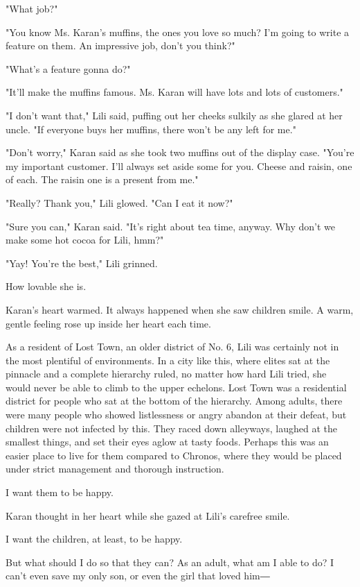 "What job?"

"You know Ms. Karan's muffins, the ones you love so much? I'm going to
write a feature on them. An impressive job, don't you think?"

"What's a feature gonna do?"

"It'll make the muffins famous. Ms. Karan will have lots and lots of
customers."

"I don't want that," Lili said, puffing out her cheeks sulkily as she
glared at her uncle. "If everyone buys her muffins, there won't be any
left for me."

"Don't worry," Karan said as she took two muffins out of the display
case. "You're my important customer. I'll always set aside some for you.
Cheese and raisin, one of each. The raisin one is a present from me."

"Really? Thank you," Lili glowed. "Can I eat it now?"

"Sure you can," Karan said. "It's right about tea time, anyway. Why
don't we make some hot cocoa for Lili, hmm?"

"Yay! You're the best," Lili grinned.

How lovable she is.

Karan's heart warmed. It always happened when she saw children smile. A
warm, gentle feeling rose up inside her heart each time.

As a resident of Lost Town, an older district of No. 6, Lili was
certainly not in the most plentiful of environments. In a city like
this, where elites sat at the pinnacle and a complete hierarchy ruled,
no matter how hard Lili tried, she would never be able to climb to the
upper echelons. Lost Town was a residential district for people who sat
at the bottom of the hierarchy. Among adults, there were many people who
showed listlessness or angry abandon at their defeat, but children were
not infected by this. They raced down alleyways, laughed at the smallest
things, and set their eyes aglow at tasty foods. Perhaps this was an
easier place to live for them compared to Chronos, where they would be
placed under strict management and thorough instruction.

I want them to be happy.

Karan thought in her heart while she gazed at Lili's carefree smile.

I want the children, at least, to be happy.

But what should I do so that they can? As an adult, what am I able to
do? I can't even save my only son, or even the girl that loved him―

